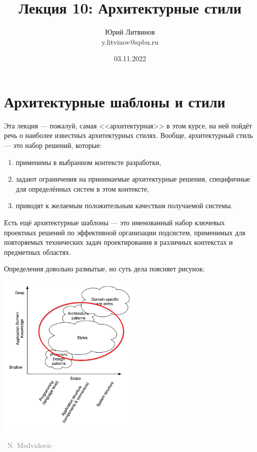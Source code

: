 \documentclass[a5paper]{article}
\title{Лекция 10: Архитектурные стили}
\author{Юрий Литвинов\\\small{y.litvinov@spbu.ru}}
\date{03.11.2022}
\newcommand{\attribution}[1] {
    \vspace{-4mm}\begin{flushright}\begin{scriptsize}\textcolor{gray}
    {\textcopyright\, #1}\end{scriptsize}\end{flushright}
}
\begin{document}
\maketitle
\thispagestyle{empty}

\section{Архитектурные шаблоны и стили}

Эта лекция --- пожалуй, самая <<архитектурная>> в этом курсе, на ней пойдёт речь о наиболее известных архитектурных стилях. Вообще, архитектурный стиль --- это набор решений, которые:

\begin{enumerate}
    \item применимы в выбранном контексте разработки,
    \item задают ограничения на принимаемые архитектурные решения, специфичные для определённых систем в этом контексте,
    \item приводят к желаемым положительным качествам получаемой системы.
\end{enumerate}

Есть ещё архитектурные шаблоны --- это именованный набор ключевых проектных решений по эффективной организации подсистем, применимых для повторяемых технических задач проектирования в различных контекстах и предметных областях.

Определения довольно размытые, но суть дела поясняет рисунок:

\begin{center}
    \includegraphics[width=0.52\textwidth]{architecturalStylesHighlighted.png}
    \attribution{N. Medvidovic}
\end{center}
\end{document}
